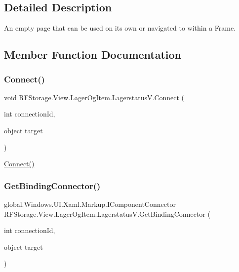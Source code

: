 \subsection{Detailed Description}
An empty page that can be used on its own or navigated to within a Frame. 



\subsection{Member Function Documentation}
\mbox{\label{class_r_f_storage_1_1_view_1_1_lager_og_item_1_1_lagerstatus_v_a5adb4132d52f87153cc6fccc8db341de}} 
\subsubsection{\texorpdfstring{Connect()}{Connect()}}
{\footnotesize\ttfamily void R\+F\+Storage.\+View.\+Lager\+Og\+Item.\+Lagerstatus\+V.\+Connect (\begin{DoxyParamCaption}\item[{int}]{connection\+Id,  }\item[{object}]{target }\end{DoxyParamCaption})}



\mbox{\hyperlink{class_r_f_storage_1_1_view_1_1_lager_og_item_1_1_lagerstatus_v_a5adb4132d52f87153cc6fccc8db341de}{Connect()}} 

\mbox{\label{class_r_f_storage_1_1_view_1_1_lager_og_item_1_1_lagerstatus_v_ab4f51395e6c25555fcf55a3802b4e4e0}} 
\subsubsection{\texorpdfstring{GetBindingConnector()}{GetBindingConnector()}}
{\footnotesize\ttfamily global.\+Windows.\+U\+I.\+Xaml.\+Markup.\+I\+Component\+Connector R\+F\+Storage.\+View.\+Lager\+Og\+Item.\+Lagerstatus\+V.\+Get\+Binding\+Connector (\begin{DoxyParamCaption}\item[{int}]{connection\+Id,  }\item[{object}]{target }\end{DoxyParamCaption})}



